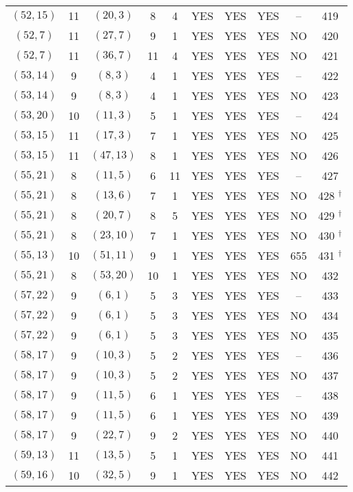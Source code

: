 \begin{longtable}{|c|c|c|c|c|c|c|c|c|c|}
$(52, 15)$ & 11 & $(20, 3)$ & 8 & 4 & YES & YES & YES & -- & 419\\
$(52, 7)$ & 11 & $(27, 7)$ & 9 & 1 & YES & YES & YES & NO & 420\\
$(52, 7)$ & 11 & $(36, 7)$ & 11 & 4 & YES & YES & YES & NO & 421\\
$(53, 14)$ & 9 & $(8, 3)$ & 4 & 1 & YES & YES & YES & -- & 422\\
$(53, 14)$ & 9 & $(8, 3)$ & 4 & 1 & YES & YES & YES & NO & 423\\
$(53, 20)$ & 10 & $(11, 3)$ & 5 & 1 & YES & YES & YES & -- & 424\\
$(53, 15)$ & 11 & $(17, 3)$ & 7 & 1 & YES & YES & YES & NO & 425\\
$(53, 15)$ & 11 & $(47, 13)$ & 8 & 1 & YES & YES & YES & NO & 426\\
$(55, 21)$ & 8 & $(11, 5)$ & 6 & 11 & YES & YES & YES & -- & 427\\
$(55, 21)$ & 8 & $(13, 6)$ & 7 & 1 & YES & YES & YES & NO & 428 ${}^\dagger$\\
$(55, 21)$ & 8 & $(20, 7)$ & 8 & 5 & YES & YES & YES & NO & 429 ${}^\dagger$\\
$(55, 21)$ & 8 & $(23, 10)$ & 7 & 1 & YES & YES & YES & NO & 430 ${}^\dagger$\\
$(55, 13)$ & 10 & $(51, 11)$ & 9 & 1 & YES & YES & YES & 655 & 431 ${}^\dagger$\\
$(55, 21)$ & 8 & $(53, 20)$ & 10 & 1 & YES & YES & YES & NO & 432\\
$(57, 22)$ & 9 & $(6, 1)$ & 5 & 3 & YES & YES & YES & -- & 433\\
$(57, 22)$ & 9 & $(6, 1)$ & 5 & 3 & YES & YES & YES & NO & 434\\
$(57, 22)$ & 9 & $(6, 1)$ & 5 & 3 & YES & YES & YES & NO & 435\\
$(58, 17)$ & 9 & $(10, 3)$ & 5 & 2 & YES & YES & YES & -- & 436\\
$(58, 17)$ & 9 & $(10, 3)$ & 5 & 2 & YES & YES & YES & NO & 437\\
$(58, 17)$ & 9 & $(11, 5)$ & 6 & 1 & YES & YES & YES & -- & 438\\
$(58, 17)$ & 9 & $(11, 5)$ & 6 & 1 & YES & YES & YES & NO & 439\\
$(58, 17)$ & 9 & $(22, 7)$ & 9 & 2 & YES & YES & YES & NO & 440\\
$(59, 13)$ & 11 & $(13, 5)$ & 5 & 1 & YES & YES & YES & NO & 441\\
$(59, 16)$ & 10 & $(32, 5)$ & 9 & 1 & YES & YES & YES & NO & 442\\

\end{longtable}
